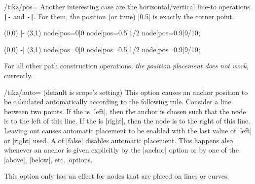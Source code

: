 \begin{key}{/tikz/pos=}
    Another interesting case are the horizontal/vertical line-to operations
    \verb!|-! and \verb!-|!. For them, the position (or time) |0.5| is exactly
    the corner point.
\begin{codeexample}[]
\tikz \draw (0,0) |- (3,1)
  node[pos=0]{0} node[pos=0.5]{1/2} node[pos=0.9]{9/10};
\end{codeexample}

\begin{codeexample}[]
\tikz \draw (0,0) -| (3,1)
  node[pos=0]{0} node[pos=0.5]{1/2} node[pos=0.9]{9/10};
\end{codeexample}

    For all other path construction operations, \emph{the position placement
    does not work}, currently.
\end{key}

\begin{key}{/tikz/auto= (default \normalfont is scope's setting)}
    This option causes an anchor position to be calculated automatically
    according to the following rule. Consider a line between two points. If the
     is |left|, then the anchor is chosen such that the node is
    to the left of this line. If the  is |right|, then the node
    is to the right of this line. Leaving out  causes automatic
    placement to be enabled with the last value of |left| or |right| used. A
     of |false| disables automatic placement. This happens also
    whenever an anchor is given explicitly by the |anchor| option or by one of
    the |above|, |below|, etc.\ options.

    This option only has an effect for nodes that are placed on lines or
    curves.
\begin{codeexample}[]
\end{codeexample}
\end{key}


